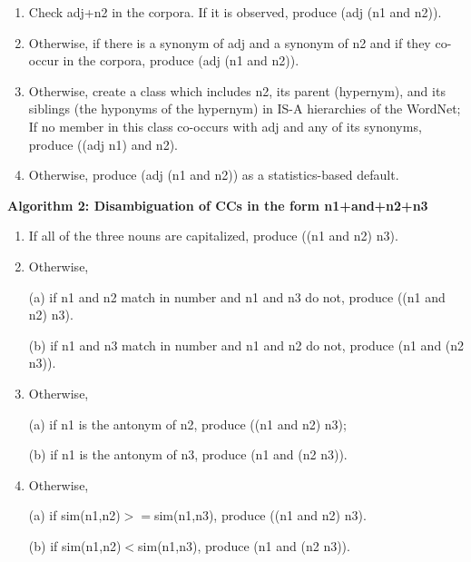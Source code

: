 \vspace*{2mm}
{\small
\begin{enumerate}
\vspace*{-1mm}
 \item Check adj+n2 in the corpora. If it is observed, produce 
(adj (n1 and n2)).

\vspace*{-1mm}
 \item Otherwise, if there is a synonym of adj and a synonym of
n2 and if they co-occur in the corpora, produce (adj (n1 and n2)).

\vspace*{-1mm}
 \item Otherwise, create a class which includes n2, its
parent (hypernym), and its siblings (the hyponyms of the hypernym) in
IS-A hierarchies of the WordNet; If no member in this class  
co-occurs with adj and any of its synonyms, produce ((adj n1) and n2).

\vspace*{-1mm}
 \item Otherwise, produce (adj (n1 and n2)) as a statistics-based
default.

\end{enumerate}
}


\vspace*{5mm}

\hspace*{-5mm} {\bf Algorithm 2: Disambiguation of CCs in the form n1+and+n2+n3}

\vspace*{2mm}
{\small
 \begin{enumerate}

\vspace*{-1mm}
 \item If all of the three nouns are capitalized, produce ((n1 and n2) n3).

\vspace*{-1mm}
 \item Otherwise,

(a) if n1 and n2 match in number and n1 and n3 do not,
 produce ((n1 and n2) n3).

\vspace*{-1mm}
 (b) if n1 and n3 match in number and n1 and n2 do not,
 produce (n1 and (n2 n3)).

\vspace*{-1mm}
 \item Otherwise,

 (a) if n1 is the antonym of n2, produce ((n1 and n2) n3);

\vspace*{-1mm}
 (b) if n1 is the antonym of n3, produce (n1 and (n2 n3)).

	
\vspace*{-1mm}
 \item Otherwise,


 (a) if sim(n1,n2)$>=$sim(n1,n3), produce ((n1 and n2) n3).


 (b) if sim(n1,n2)$<$sim(n1,n3), produce (n1 and (n2 n3)).
 \end{enumerate}
}

